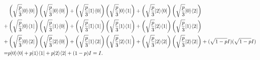 \documentclass{assignment}
\begin{document}
\begin{sol}
\begin{align}
        \notag&\left(\sqrt{\frac{p}{3}}\lvert 0\rangle\langle 0\rvert\right)\left(\sqrt{\frac{p}{3}}\lvert 0\rangle\langle 0\rvert\right)+\left(\sqrt{\frac{p}{3}}\lvert 1\rangle\langle 0\rvert\right)\left(\sqrt{\frac{p}{3}}\lvert 0\rangle\langle 1\rvert\right)+\left(\sqrt{\frac{p}{3}}\lvert 2\rangle\langle 0\rvert\right)\left(\sqrt{\frac{p}{3}}\lvert 0\rangle\langle 2\rvert\right)\\
        \notag+&\left(\sqrt{\frac{p}{3}}\lvert 0\rangle\langle 1\rvert\right)\left(\sqrt{\frac{p}{3}}\lvert 1\rangle\langle 0\rvert\right)+\left(\sqrt{\frac{p}{3}}\lvert 1\rangle\langle 1\rvert\right)\left(\sqrt{\frac{p}{3}}\lvert 1\rangle\langle 1\rvert\right)+\left(\sqrt{\frac{p}{3}}\lvert 2\rangle\langle 1\rvert\right)\left(\sqrt{\frac{p}{3}}\lvert 1\rangle\langle 2\rvert\right)\\
        \notag+&\left(\sqrt{\frac{p}{3}}\lvert 0\rangle\langle 2\rvert\right)\left(\sqrt{\frac{p}{3}}\lvert 2\rangle\langle 0\rvert\right)+\left(\sqrt{\frac{p}{3}}\lvert 1\rangle\langle 2\rvert\right)\left(\sqrt{\frac{p}{3}}\lvert 2\rangle\langle 1\rvert\right)+\left(\sqrt{\frac{p}{3}}\lvert 2\rangle\langle 2\rvert\right)\left(\sqrt{\frac{p}{3}}\lvert 2\rangle\langle 2\rvert\right)+(\sqrt{1-p}I)(\sqrt{1-p}I)\\
        =&p\lvert 0\rangle\langle 0\rvert+p\lvert 1\rangle\langle 1\rvert+p\lvert 2\rangle\langle 2\rvert+(1-p)I=I.
    \end{align}
\end{sol}
\end{document}
